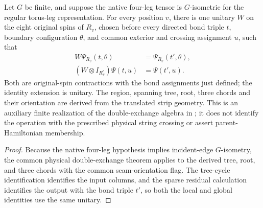 \begin{lemma}%
    \label{thm:peps_torus_three_plaquette_double_exchange_physical}
    \leanok
    Let $G$ be finite, and suppose the native four-leg tensor is
    $G$-isometric for the regular torus-leg representation.
    For every position $v$, there is one unitary $W$ on the eight original
    spins of $R_v$, chosen before every directed bond triple $t$,
    boundary configuration $\theta$, and common exterior and crossing
    assignment $u$, such that
    \begin{align}
        W\Psi_{R_v}(t,\theta)         & =\Psi_{R_v}(t',\theta), \\
        (W\otimes I_{R_v^c})\Psi(t,u) & =\Psi(t',u).
    \end{align}
    Both are original-spin contractions with the bond assignments
    just defined; the identity extension is unitary.
    The region, spanning tree, root, three chords and their orientation are
    derived from the translated strip geometry.
    This is an auxiliary finite realization of the double-exchange
    algebra in \cite[braiding passage]{Schuch2010PEPS}; it does not identify
    the operation with the prescribed physical string crossing or assert
    parent-Hamiltonian membership.
\end{lemma}

\begin{proof}\leanok
    Because the native four-leg hypothesis implies incident-edge $G$-isometry,
    the common physical double-exchange theorem applies to the derived tree,
    root, and three chords with the common seam-orientation flag.
    The tree-cycle identification identifies the input columns, and
    the sparse residual calculation identifies the output with the
    bond triple $t'$, so both the local and global identities
    use the same unitary.
\end{proof}
